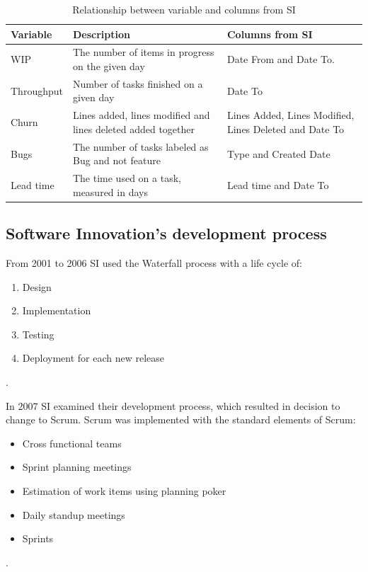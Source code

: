 \documentclass[UKenglish]{ifimaster}  %
\begin{document}
\begin{table}[!ht]
\begin{center}
    \begin{tabular}{| l | p{5cm} |  p{5cm} |}
    \hline
    Variable &	Description	 & Columns from SI\\ \hline 
     WIP & \parbox[t]{5cm}{The number of items in progress on the given day} & Date From and Date To. \\ \hline
     Throughput	& Number of tasks finished on a given day & Date To \\ \hline
     Churn & Lines added, lines modified and lines deleted added together & Lines Added, Lines Modified, Lines Deleted and Date To \\ \hline
    Bugs & The number of tasks labeled as Bug and not feature & Type and Created Date \\ \hline
    Lead time & The time used on a task, measured in days & Lead time and Date To \\ \hline
  \end{tabular}
\caption{Relationship between variable and columns from SI}
\label{des} %
\end{center}
\end{table}

\subsection{Software Innovation's development process}
From 2001 to 2006 SI used the Waterfall process with a life cycle of:
\begin{enumerate}[noitemsep,topsep=0pt,parsep=0pt,partopsep=0pt]
\item Design
\item Implementation 
\item Testing
\item Deployment for each new release
\end{enumerate} 
\parencite{Dag}. 

In 2007 SI examined their development process, which resulted in decision to change to Scrum. Scrum was implemented with the standard elements of Scrum:
\begin{itemize}[noitemsep,topsep=0pt,parsep=0pt,partopsep=0pt]
\item Cross functional teams
\item Sprint planning meetings 
\item Estimation of work items using planning poker
\item Daily standup meetings
\item Sprints
\end{itemize}
\parencite{Dag}. 
\end{document}
